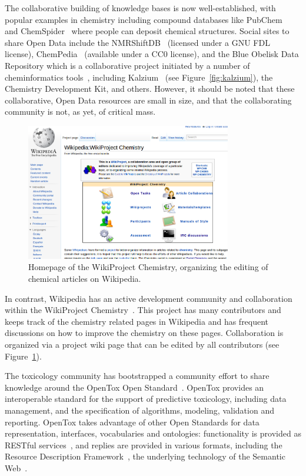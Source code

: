 \documentclass[11pt]{book}
\begin{document}
The collaborative building of knowledge bases is now well-established,
with popular examples in chemistry including compound databases
like PubChem~\cite{url:pubchem} and ChemSpider~\cite{url:chemspider}
where people can deposit chemical structures.
Social sites to share Open Data include the
NMRShiftDB~\cite{Steinbeck2004} (licensed under a GNU FDL license),
ChemPedia~\cite{chempedia} (available under a CC0 license),
and the Blue Obelisk Data Repository which is a collaborative project
initiated by a number
of cheminformatics tools~\cite{Guha2006}, including Kalzium~\cite{url:kalzium}
(see Figure~\ref{fig:kalzium}),
the Chemistry Development Kit, and others.
However, it should be noted that these collaborative, Open Data
resources are small in size, and that the collaborating community
is not, as yet, of critical mass.

\begin{figure}[bt]
\begin{center}
\includegraphics[width=0.8\textwidth]{graphics/wikichemistry}
\end{center}
\caption{Homepage of the WikiProject Chemistry, organizing the
editing of chemical articles on Wikipedia.}
\label{fig:wikichem}
\end{figure}

In contrast, Wikipedia has an active development community and
collaboration within the WikiProject Chemistry~\cite{wikichem}.
This project has many contributors and keeps track of the chemistry
related pages in Wikipedia and has frequent discussions on how
to improve the chemistry on these pages. Collaboration is organized
via a project wiki page that can be edited by all contributors
(see Figure~\ref{fig:wikichem}).

The toxicology community has bootstrapped
a community effort to share knowledge around the OpenTox Open Standard~\cite{Hardy2010}.
OpenTox provides an interoperable standard for the support of predictive toxicology,
including data management, and the specification of algorithms, modeling, validation and
reporting. OpenTox takes advantage of other Open Standards for data representation,
interfaces, vocabularies and ontologies: functionality is provided as
RESTful services~\cite{fielding:2000},
and replies are provided in various formats, including the Resource Description
Framework~\cite{Carroll:04:RDF},
the underlying technology of the Semantic Web~\cite{BernersLee2001}.
\end{document}
